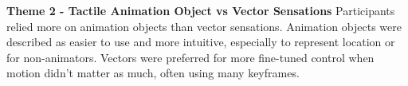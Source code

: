 \textbf{Theme 2 - Tactile Animation Object vs Vector Sensations}
Participants relied more on animation objects %
than vector sensations. %
Animation objects were described as easier to use and more intuitive, especially to represent location or for non-animators.
Vectors were preferred for more fine-tuned control when motion didn't matter as much, often using many keyframes.

%
%
%
%
%
%



